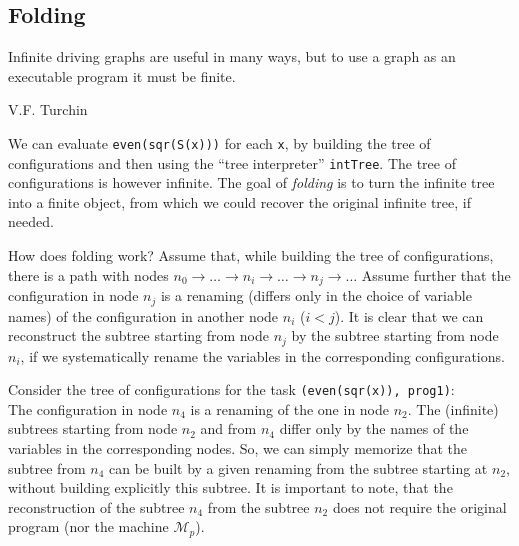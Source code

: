 
\subsection{Folding}
\epigraph{Infinite driving graphs are useful in many ways, but to use a graph as an executable program it must be finite.}
{V.F. Turchin \cite{Turchin1986ProgramTrans}}
We can evaluate \texttt{even(sqr(S(x)))} for each \texttt{x}, by building the tree of configurations
and then using the ``tree interpreter'' \texttt{intTree}. 
The tree of configurations is however infinite.
The goal of \emph{folding} is to turn the infinite tree into a finite object,
from which we could recover the original infinite tree, if needed.

How does folding work?
Assume that, while building the tree of configurations, there is a path with nodes
$n_0 \rightarrow \ldots \rightarrow n_i \rightarrow \ldots \rightarrow n_j
\rightarrow \ldots$
Assume further that the configuration in node $n_j$ is a renaming (differs only in the choice
of variable names) of the configuration in another node $n_i$ ($i < j$). 
It is clear that we can reconstruct the subtree starting from node $n_j$
by the subtree starting from node $n_i$, if
we systematically rename the variables in the corresponding configurations.

Consider the tree of configurations for the task \texttt{(even(sqr(x)), prog1)}: \\


The configuration in node $n_4$ is a renaming of the one in node $n_2$.
The (infinite) subtrees starting from node $n_2$ and from $n_4$ differ only by the
names of the variables in the corresponding nodes.
So, we can simply memorize that the subtree from $n_4$ can be built by
a given renaming from the subtree starting at $n_2$, 
without building explicitly this subtree.
It is important to note, that the reconstruction of the subtree
$n_4$ from the subtree $n_2$ does not require the original program (nor the machine $\mathcal{M}_p$).

